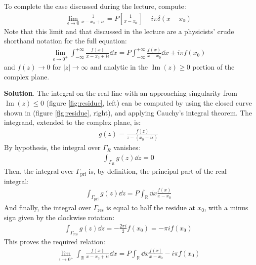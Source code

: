 \documentclass[../template.tex]{subfiles}
\begin{document}
\begin{exo}
    To complete the case discussed during the lecture, compute:
    \begin{align*}
        \lim_{\epsilon \to 0} \frac{1}{x - x_0 + i \epsilon} = P\left[\frac{1}{x - x_0 } \right] - i \pi \delta (x - x_0 )
    \end{align*}
    Note that this limit and that discussed in the lecture are a physicists' crude shorthand notation for the full equation:
    \begin{align*}
        \lim_{\epsilon \to 0^+} \int_{-\infty}^{+\infty} \frac{f(x)}{x - x_0 \mp i \epsilon} \dd{x} = P \int_{-\infty}^{+\infty} \frac{f(x)}{x- x_0} \dd{x} \pm i \pi f(x_0)  
    \end{align*}
    and $f(z) \to 0$ for $|z| \to \infty$ and analytic in the $\operatorname{Im}(z) \geq 0$ portion of the complex plane.
    
    \medskip

    \textbf{Solution}. The integral on the real line with an approaching singularity from $\operatorname{Im}(z) \leq 0$ (figure \ref{fig:residue}, left) can be computed by using the closed curve shown in (figure \ref{fig:residue}, right), and applying Cauchy's integral theorem.
    The integrand, extended to the complex plane, is:
    \begin{align*}
        g(z) = \frac{f(z)}{z - (x_0 - i \epsilon)} 
    \end{align*}
    By hypothesis, the integral over $\Gamma_R$ vanishes:
    \begin{align*}
        \int_{\Gamma_R} g(z) \dd{z} = 0
    \end{align*}
    Then, the integral over $\Gamma_{\mathrm{pri}}$ is, by definition, the principal part of the real integral:
    \begin{align*}
        \int_{\Gamma_{\mathrm{pri} }} g(z) \dd{z} = P \int_{\mathbb{R}} \dd{x} \frac{f(x)}{x-x_0} 
    \end{align*}
    And finally, the integral over $\Gamma_{\mathrm{res}}$ is equal to half the residue at $x_0$, with a minus sign given by the clockwise rotation:
    \begin{align*}
        \int_{\Gamma_{\mathrm{res}}} g(z) \dd{z} = - \frac{2\pi i}{2} f(x_0) = - \pi i f(x_0) 
    \end{align*}
    This proves the required relation:
    \begin{align*}
        \lim_{\epsilon \to 0^+} \int_{\mathbb{R}} \frac{f(x)}{x - x_0 + i \epsilon} \dd{x} = P \int_{\mathbb{R}} \dd{x} \frac{f(x)}{x- x_0} - i \pi f(x_0)  
    \end{align*}
\end{exo}
\end{document}
